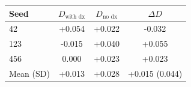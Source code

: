 \begin{tabular}{lccc}
\toprule
Seed & $D_{\text{with dx}}$ & $D_{\text{no dx}}$ & $\Delta D$ \\
\midrule
42 & +0.054 & +0.022 & -0.032 \\
123 & -0.015 & +0.040 & +0.055 \\
456 & 0.000 & +0.023 & +0.023 \\
\midrule
Mean (SD) & +0.013 & +0.028 & +0.015 (0.044) \\
\bottomrule
\end{tabular}
